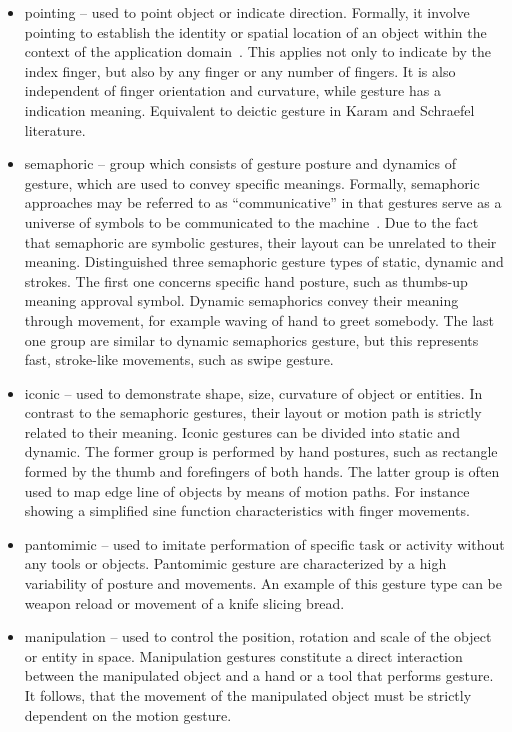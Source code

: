 \begin{itemize}

\item pointing -- used to point object or indicate direction. Formally, it involve pointing to establish the identity or spatial location of an object within the context of the application domain~\cite{Karam05ataxonomy}. This applies not only to indicate by the index finger, but also by any finger or any number of fingers. It is also independent of finger orientation and curvature, while gesture has a indication meaning. Equivalent to deictic gesture in Karam and Schraefel literature.

\item semaphoric -- group which consists of gesture posture and dynamics of gesture, which are used to convey specific meanings. Formally, semaphoric approaches may be referred to as ``communicative'' in that gestures serve as a universe of symbols to be communicated to the machine~\cite{Quek:2002:MHD:568513.568514}. Due to the fact that semaphoric are symbolic gestures, their layout can be unrelated to their meaning. Distinguished three semaphoric gesture types of static, dynamic and strokes. The first one concerns specific hand posture, such as thumbs-up meaning approval symbol.
Dynamic semaphorics convey their meaning through movement, for example waving of hand to greet somebody. The last one group are similar to dynamic semaphorics gesture, but this represents fast, stroke-like movements, such as swipe gesture.

\item iconic -- used to demonstrate shape, size, curvature of object or entities. In contrast to the semaphoric gestures, their layout or motion path is strictly related to their meaning. Iconic gestures can be divided into static and dynamic. The former group is performed by hand postures, such as rectangle formed by the thumb and forefingers of both hands. The latter group is often used to map edge line of objects by means of motion paths. For instance showing a simplified sine function characteristics with finger movements.

\item pantomimic -- used to imitate performation of specific task or activity without any tools or objects. Pantomimic gesture are characterized by a high variability of posture and movements. An example of this gesture type can be weapon reload or movement of a knife slicing bread.

\item manipulation -- used to control the position, rotation and scale of the object or entity in space. Manipulation gestures constitute a direct interaction between the manipulated object and a hand or a tool that performs gesture. It follows, that the movement of the manipulated object must be strictly dependent on the motion gesture.
\end{itemize}

